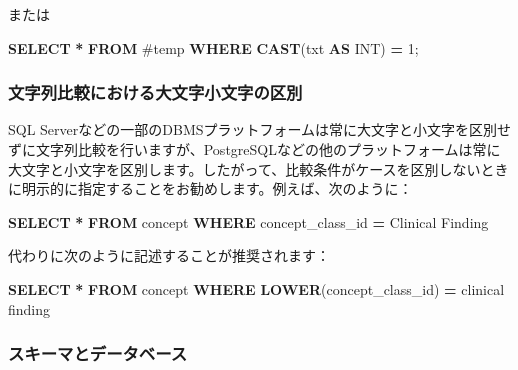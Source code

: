 \documentclass[
  11pt]{book}
\newenvironment{Shaded}{\begin{snugshade}}{\end{snugshade}}
\newcommand{\DataTypeTok}[1]{\textcolor[rgb]{0.13,0.29,0.53}{#1}}
\newcommand{\DecValTok}[1]{\textcolor[rgb]{0.00,0.00,0.81}{#1}}
\newcommand{\FunctionTok}[1]{\textcolor[rgb]{0.13,0.29,0.53}{\textbf{#1}}}
\newcommand{\KeywordTok}[1]{\textcolor[rgb]{0.13,0.29,0.53}{\textbf{#1}}}
\newcommand{\NormalTok}[1]{#1}
\newcommand{\OperatorTok}[1]{\textcolor[rgb]{0.81,0.36,0.00}{\textbf{#1}}}
\newcommand{\StringTok}[1]{\textcolor[rgb]{0.31,0.60,0.02}{#1}}
\theoremstyle{definition}
\theoremstyle{definition}
\theoremstyle{definition}
\theoremstyle{definition}
\theoremstyle{remark}
\begin{document}
または

\begin{Shaded}
\begin{Highlighting}[]
\KeywordTok{SELECT} \OperatorTok{*} \KeywordTok{FROM}\NormalTok{ \#temp }\KeywordTok{WHERE} \FunctionTok{CAST}\NormalTok{(txt }\KeywordTok{AS} \DataTypeTok{INT}\NormalTok{) }\OperatorTok{=} \DecValTok{1}\NormalTok{;}
\end{Highlighting}
\end{Shaded}

\subsubsection*{文字列比較における大文字小文字の区別}\label{ux6587ux5b57ux5217ux6bd4ux8f03ux306bux304aux3051ux308bux5927ux6587ux5b57ux5c0fux6587ux5b57ux306eux533aux5225}

SQL Serverなどの一部のDBMSプラットフォームは常に大文字と小文字を区別せずに文字列比較を行いますが、PostgreSQLなどの他のプラットフォームは常に大文字と小文字を区別します。したがって、比較条件がケースを区別しないときに明示的に指定することをお勧めします。例えば、次のように：

\begin{Shaded}
\begin{Highlighting}[]
\KeywordTok{SELECT} \OperatorTok{*} \KeywordTok{FROM}\NormalTok{ concept }\KeywordTok{WHERE}\NormalTok{ concept\_class\_id }\OperatorTok{=} \StringTok{\textquotesingle{}Clinical Finding\textquotesingle{}}
\end{Highlighting}
\end{Shaded}

代わりに次のように記述することが推奨されます：

\begin{Shaded}
\begin{Highlighting}[]
\KeywordTok{SELECT} \OperatorTok{*} \KeywordTok{FROM}\NormalTok{ concept }\KeywordTok{WHERE} \FunctionTok{LOWER}\NormalTok{(concept\_class\_id) }\OperatorTok{=} \StringTok{\textquotesingle{}clinical finding\textquotesingle{}}
\end{Highlighting}
\end{Shaded}

\subsubsection*{スキーマとデータベース}\label{ux30b9ux30adux30fcux30deux3068ux30c7ux30fcux30bfux30d9ux30fcux30b9}
\end{document}
